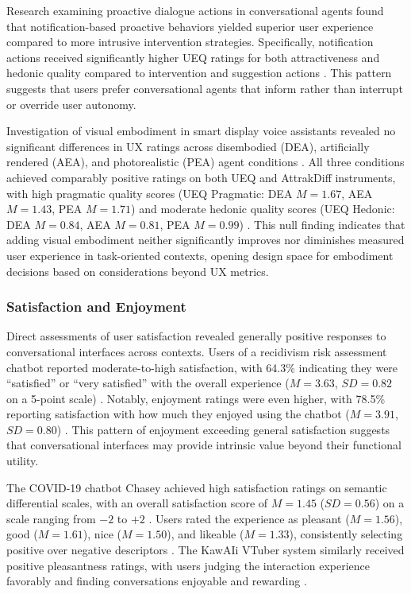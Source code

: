\documentclass[manuscript,anonymous,sigconf]{acmart}
\begin{document}
Research examining proactive dialogue actions in conversational agents found that notification-based proactive behaviors yielded superior user experience compared to more intrusive intervention strategies. Specifically, notification actions received significantly higher UEQ ratings for both attractiveness and hedonic quality compared to intervention and suggestion actions \cite{A16}. This pattern suggests that users prefer conversational agents that inform rather than interrupt or override user autonomy.

Investigation of visual embodiment in smart display voice assistants revealed no significant differences in UX ratings across disembodied (DEA), artificially rendered (AEA), and photorealistic (PEA) agent conditions \cite{A86}. All three conditions achieved comparably positive ratings on both UEQ and AttrakDiff instruments, with high pragmatic quality scores (UEQ Pragmatic: DEA $M = 1.67$, AEA $M = 1.43$, PEA $M = 1.71$) and moderate hedonic quality scores (UEQ Hedonic: DEA $M = 0.84$, AEA $M = 0.81$, PEA $M = 0.99$) \cite{A86}. This null finding indicates that adding visual embodiment neither significantly improves nor diminishes measured user experience in task-oriented contexts, opening design space for embodiment decisions based on considerations beyond UX metrics.

\subsubsection{Satisfaction and Enjoyment}

Direct assessments of user satisfaction revealed generally positive responses to conversational interfaces across contexts. Users of a recidivism risk assessment chatbot reported moderate-to-high satisfaction, with 64.3\% indicating they were ``satisfied'' or ``very satisfied'' with the overall experience ($M = 3.63$, $SD = 0.82$ on a 5-point scale) \cite{A54}. Notably, enjoyment ratings were even higher, with 78.5\% reporting satisfaction with how much they enjoyed using the chatbot ($M = 3.91$, $SD = 0.80$) \cite{A54}. This pattern of enjoyment exceeding general satisfaction suggests that conversational interfaces may provide intrinsic value beyond their functional utility.

The COVID-19 chatbot Chasey achieved high satisfaction ratings on semantic differential scales, with an overall satisfaction score of $M = 1.45$ ($SD = 0.56$) on a scale ranging from $-2$ to $+2$ \cite{A79}. Users rated the experience as pleasant ($M = 1.56$), good ($M = 1.61$), nice ($M = 1.50$), and likeable ($M = 1.33$), consistently selecting positive over negative descriptors \cite{A79}. The KawAIi VTuber system similarly received positive pleasantness ratings, with users judging the interaction experience favorably and finding conversations enjoyable and rewarding \cite{A81}.
\end{document}
